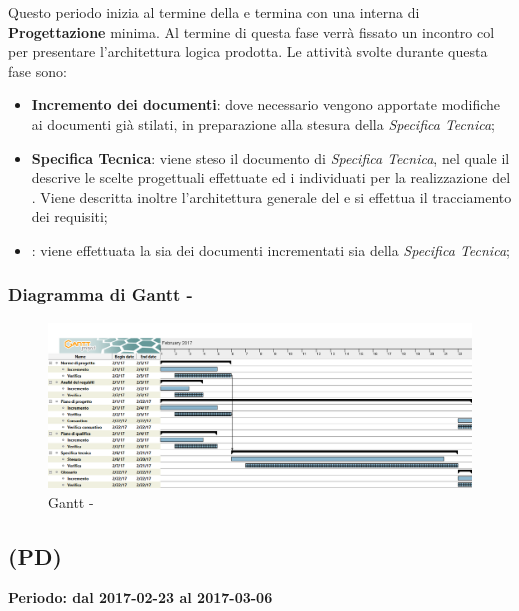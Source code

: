 \documentclass[./PianoDiProgetto.tex]{subfiles}
\begin{document}
\begin{itemize}
  Questo periodo inizia al termine della \PerAD{} e termina con una  interna di \textbf{\label{Revisione} Progettazione} minima. Al termine di questa fase verrà fissato un incontro col  per presentare l'architettura logica prodotta. Le attività svolte durante questa fase sono:
  \begin{itemize}
    \item \textbf{Incremento dei documenti}: dove necessario vengono apportate modifiche ai documenti già stilati, in preparazione alla stesura della \textit{Specifica Tecnica};
    \item \textbf{Specifica Tecnica}: viene steso il documento di \textit{Specifica Tecnica}, nel quale il \PJ{} descrive le scelte progettuali effettuate ed i  individuati per la realizzazione del . Viene descritta inoltre l'architettura generale del  e si effettua il tracciamento dei requisiti;
    \item \textbf{}: viene effettuata la  sia dei documenti incrementati sia della \textit{Specifica Tecnica};
  \end{itemize}

  \end{itemize}
  \newpage
  \subsubsection{Diagramma di Gantt - \PerPA}
    \begin{figure}[!h]
    \centering
    \includegraphics[width=\textwidth]{images/PA}
    \caption{Gantt - \PerPA}
    \end{figure}

  \subsection{\PerPD{} (PD)}
  \textbf{Periodo: dal 2017-02-23 al 2017-03-06}
\end{document}
